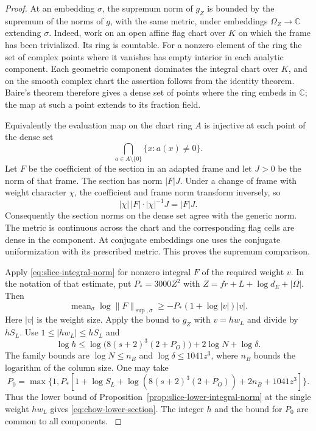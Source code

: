 \begin{proof}
At an embedding \(\sigma\), the supremum norm of \(g_Z\) is bounded
by the supremum of the norms of \(g\), with the same metric, under embeddings \(\Omega_Z\to\mathbb C\) extending
\(\sigma\). Indeed, work on an open affine flag chart over \(K\)
on which the frame has been trivialized. Its ring is countable.
For a nonzero element of the ring the set of complex points
where it vanishes has empty interior in each analytic component.
Each geometric component dominates the integral chart over \(K\),
and on the smooth complex chart the assertion follows from
the identity theorem. Baire's theorem therefore gives a dense
set of points where the ring embeds in \(\mathbb C\); the map
at such a point extends to its fraction field.

Equivalently the evaluation map on the chart ring \(A\) is injective at each point of the dense set
\[
  \bigcap_{a\in A\setminus\{0\}}\bigl\{x:a(x)\ne0\bigr\}.
\]
Let \(F\) be the coefficient of the section in an adapted frame and
let \(J>0\) be the norm of that frame. The section has norm \(|F|J\).
Under a change of frame with weight character \(\chi\), the coefficient
and frame norm transform inversely, so
\[
  |\chi|\,|F|\cdot |\chi|^{-1}J=|F|J.
\]
Consequently the section norms on the dense set agree
with the generic norm. The metric is continuous across the
chart and the corresponding flag cells are dense in the component.
At conjugate embeddings one uses the conjugate uniformization
with its prescribed metric. This proves the supremum comparison.

Apply \eqref{eq:slice-integral-norm} for nonzero integral
\(F\) of the required weight \(v\). In the notation of that
estimate, put \(P_*=3000Z^2\) with \(Z=fr+L+\log d_E+|\Omega|\).
Then
\[
  \operatorname{mean}_\sigma\log\|F\|_{\sup,\sigma}
        \ge-P_* (1+\log|v|)|v| .
\]
Here \(|v|\) is the weight size. Apply the bound to \(g_Z\)
with \(v=h w_L\) and divide by \(hS_L\). Use \(1\le |h w_L|\le hS_L\)
and
\[
 \log h\le \log\!\big(8(s+2)^3(2+P_O)\big)
            +2\log N+\log\delta .
\]
The family bounds are \(\log N\le n_B\) and
\(\log\delta\le1041z^3\), where \(n_B\) bounds the logarithm
of the column size. One may take
\begin{equation}\label{eq:component-chow-lower-constant}
 P_0=\max\{1,P_*[1+\log S_L+\log(8(s+2)^3(2+P_O))
                                         +2n_B+1041z^3]\}.
\end{equation}
Thus the lower bound of Proposition~\ref{prop:slice-lower-integral-norm}
at the single weight \(h w_L\) gives \eqref{eq:chow-lower-section}.
The integer \(h\) and the bound for \(P_0\) are common to all components. \label{cor:slice-metrics-1}

\end{proof}


